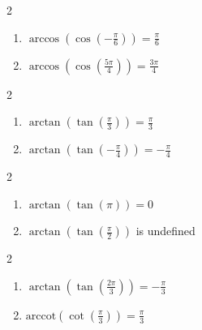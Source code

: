 \documentclass{ximera}
\begin{document}
\begin{multicols}{2}

\begin{enumerate}

\setcounter{enumi}{\value{HW}}

\item  $\arccos\left(\cos\left(-\frac{\pi}{6}\right) \right) = \frac{\pi}{6}$ 
\item  $\arccos\left(\cos\left(\frac{5\pi}{4}\right) \right) = \frac{3\pi}{4}$

\setcounter{HW}{\value{enumi}}

\end{enumerate}

\end{multicols}

\begin{multicols}{2}

\begin{enumerate}

\setcounter{enumi}{\value{HW}}

\item  $\arctan\left(\tan\left(\frac{\pi}{3}\right) \right) = \frac{\pi}{3}$
\item  $\arctan\left(\tan\left(-\frac{\pi}{4}\right) \right) = -\frac{\pi}{4}$

\setcounter{HW}{\value{enumi}}

\end{enumerate}

\end{multicols}

\begin{multicols}{2}

\begin{enumerate}

\setcounter{enumi}{\value{HW}}

\item  $\arctan\left(\tan\left(\pi\right) \right) = 0$ 
\item  $\arctan\left(\tan\left(\frac{\pi}{2}\right) \right)$ is undefined

\setcounter{HW}{\value{enumi}}

\end{enumerate}

\end{multicols}

\begin{multicols}{2}

\begin{enumerate}

\setcounter{enumi}{\value{HW}}

\item  $\arctan\left(\tan\left(\frac{2\pi}{3}\right) \right) = -\frac{\pi}{3}$
\item  $\text{arccot}\left(\cot\left(\frac{\pi}{3}\right) \right) = \frac{\pi}{3}$ 

\setcounter{HW}{\value{enumi}}

\end{enumerate}

\end{multicols}
\end{document}
